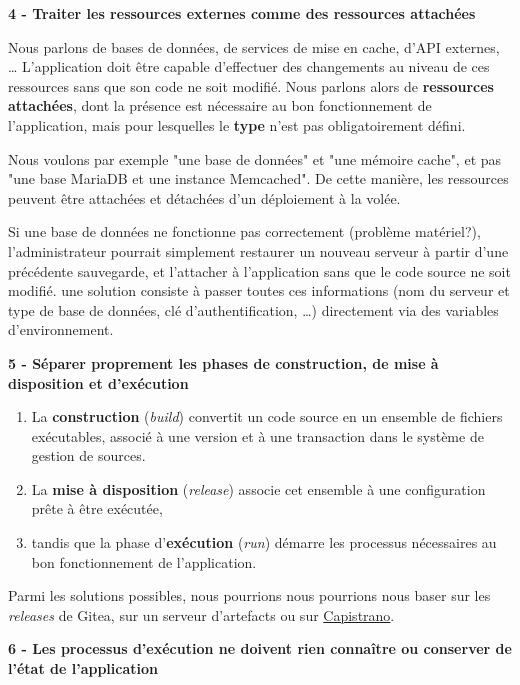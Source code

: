 \documentclass[11pt]{amsbook}
\begin{document}
\textbf{4 - Traiter les ressources externes comme des ressources attachées}


Nous parlons de bases de données, de services de mise en cache, d’API externes, …​
L’application doit être capable d’effectuer des changements au niveau de ces ressources sans que son code ne soit modifié. Nous parlons alors de \textbf{ressources attachées}, dont la présence est nécessaire au bon fonctionnement de l’application, mais pour lesquelles le \textbf{type} n’est pas obligatoirement défini.


Nous voulons par exemple "une base de données" et "une mémoire cache", et pas "une base MariaDB et une instance Memcached". De cette manière, les ressources peuvent être attachées et détachées d’un déploiement à la volée.


Si une base de données ne fonctionne pas correctement (problème matériel?), l’administrateur pourrait simplement restaurer un nouveau serveur à partir d’une précédente sauvegarde, et l’attacher à l’application sans que le code source ne soit modifié. une solution consiste à passer toutes ces informations (nom du serveur et type de base de données, clé d’authentification, …​) directement via des variables d’environnement.


\textbf{5 - Séparer proprement les phases de construction, de mise à disposition et d’exécution}


\begin{enumerate}

\item{La \textbf{construction} (\emph{build}) convertit un code source en un ensemble de fichiers exécutables, associé à une version et à une transaction dans le système de gestion de sources.}

\item{La \textbf{mise à disposition} (\emph{release}) associe cet ensemble à une configuration prête à être exécutée,}

\item{tandis que la phase d'\textbf{exécution} (\emph{run}) démarre les processus nécessaires au bon fonctionnement de l’application.}

\end{enumerate}


Parmi les solutions possibles, nous pourrions nous pourrions nous baser sur les \emph{releases} de Gitea, sur un serveur d’artefacts ou sur \href{https://fr.wikipedia.org/wiki/Capistrano_(logiciel)}{Capistrano}.


\textbf{6 - Les processus d’exécution ne doivent rien connaître ou conserver de l’état de l’application}
\end{document}
